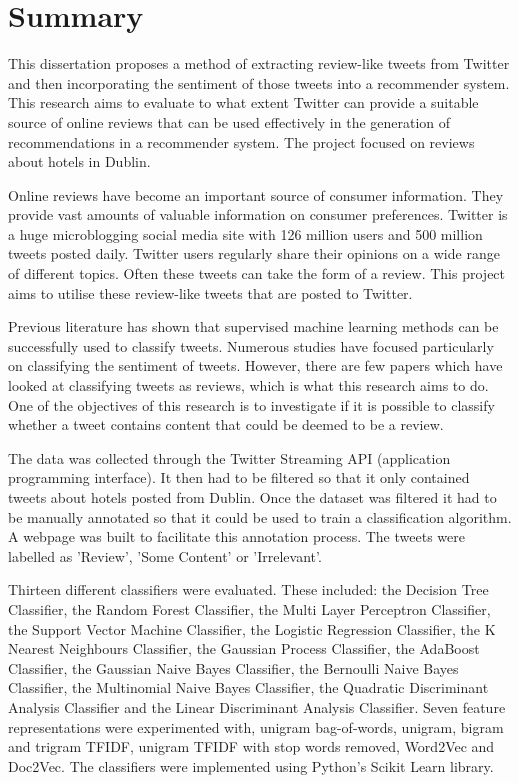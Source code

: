 \chapter{Summary}

This dissertation proposes a method of extracting review-like tweets from Twitter and then incorporating the sentiment of those tweets into a recommender system. This research aims to evaluate to what extent Twitter can provide a suitable source of online reviews that can be used effectively in the generation of recommendations in a recommender system. The project focused on reviews about hotels in Dublin.

Online reviews have become an important source of consumer information. They provide vast amounts of valuable information on consumer preferences. Twitter is a huge microblogging social media site with 126 million users and 500 million tweets posted daily. Twitter users regularly share their opinions on a wide range of different topics. Often these tweets can take the form of a review. This project aims to utilise these review-like tweets that are posted to Twitter.

Previous literature has shown that supervised machine learning methods can be successfully used to classify tweets. Numerous studies have focused particularly on classifying the sentiment of tweets. However, there are few papers which have looked at classifying tweets as reviews, which is what this research aims to do. One of the objectives of this research is to investigate if it is possible to classify whether a tweet contains content that could be deemed to be a review.

The data was collected through the Twitter Streaming API (application programming interface). It then had to be filtered so that it only contained tweets about hotels posted from Dublin. Once the dataset was filtered it had to be manually annotated so that it could be used to train a classification algorithm. A webpage was built to facilitate this annotation process. The tweets were labelled as 'Review', 'Some Content' or 'Irrelevant'.

Thirteen different classifiers were evaluated. These included: the Decision Tree Classifier, the Random Forest Classifier, the Multi Layer Perceptron Classifier, the Support Vector Machine Classifier, the Logistic Regression Classifier, the K Nearest Neighbours Classifier, the Gaussian Process Classifier, the AdaBoost Classifier, the Gaussian Naive Bayes Classifier, the Bernoulli Naive Bayes Classifier, the Multinomial Naive Bayes Classifier, the Quadratic Discriminant Analysis Classifier and the Linear Discriminant Analysis Classifier. Seven feature representations were experimented with, unigram bag-of-words, unigram, bigram and trigram TFIDF, unigram TFIDF with stop words removed, Word2Vec and Doc2Vec. The classifiers were implemented using Python's Scikit Learn library.

